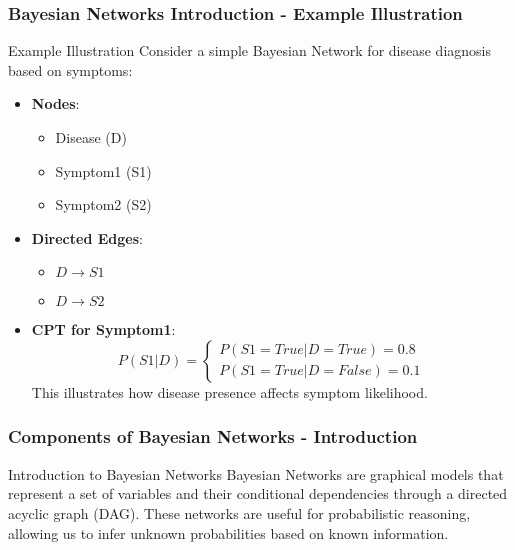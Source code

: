 \documentclass[aspectratio=169]{beamer}
\begin{document}
\begin{frame}[fragile]
    \frametitle{Bayesian Networks Introduction - Example Illustration}
    \begin{block}{Example Illustration}
        Consider a simple Bayesian Network for disease diagnosis based on symptoms:
        \begin{itemize}
            \item \textbf{Nodes}:
                \begin{itemize}
                    \item Disease (D)
                    \item Symptom1 (S1)
                    \item Symptom2 (S2)
                \end{itemize}
            \item \textbf{Directed Edges}:
                \begin{itemize}
                    \item \(D \rightarrow S1\)
                    \item \(D \rightarrow S2\)
                \end{itemize}
            \item \textbf{CPT for Symptom1}:
            \begin{equation}
                P(S1|D) =
                \begin{cases}
                    P(S1 = True | D = True) = 0.8 \\
                    P(S1 = True | D = False) = 0.1
                \end{cases}
            \end{equation}
            This illustrates how disease presence affects symptom likelihood.
        \end{itemize}
    \end{block}
\end{frame}

\begin{frame}[fragile]
    \frametitle{Components of Bayesian Networks - Introduction}
    \begin{block}{Introduction to Bayesian Networks}
        Bayesian Networks are graphical models that represent a set of variables and their conditional dependencies through a directed acyclic graph (DAG). These networks are useful for probabilistic reasoning, allowing us to infer unknown probabilities based on known information.
    \end{block}
\end{frame}
\end{document}
